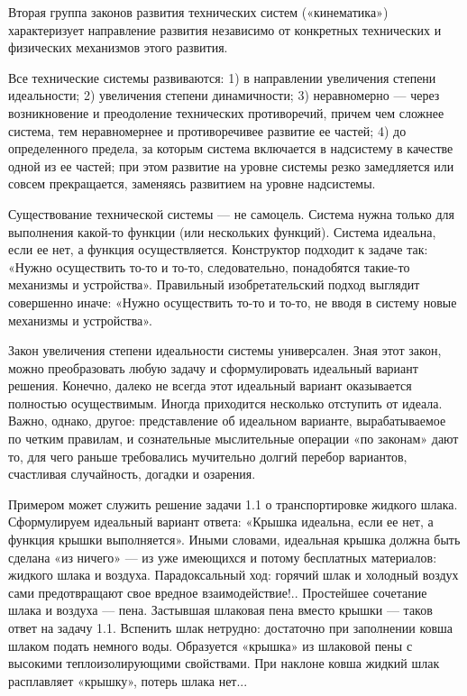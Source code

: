 Вторая  группа  законов  развития  технических  систем  («кинематика»)
характеризует   направление   развития    независимо   от   конкретных
технических и физических механизмов этого развития.

Все  технические  системы  развиваются: 1)  в  направлении  увеличения
степени   идеальности;   2)   увеличения  степени   динамичности;   3)
неравномерно   —  через   возникновение   и  преодоление   технических
противоречий,  причем   чем  сложнее  система,  тем   неравномернее  и
противоречивее  развитие ее  частей; 4)  до определенного  предела, за
которым система включается в надсистему в качестве одной из ее частей;
при  этом развитие  на  уровне системы  резко  замедляется или  совсем
прекращается, заменяясь развитием на уровне надсистемы.


Существование  технической  системы  —   не  самоцель.  Система  нужна
только  для  выполнения  какой-то функции  (или  нескольких  функций).
Система   идеальна,   если   ее   нет,   а   функция   осуществляется.
Конструктор  подходит  к  задаче   так:  «Нужно  осуществить  то-то  и
то-то,  следовательно, понадобятся  такие-то механизмы  и устройства».
Правильный изобретательский  подход выглядит совершенно  иначе: «Нужно
осуществить  то-то и  то-то,  не  вводя в  систему  новые механизмы  и
устройства».

Закон  увеличения   степени  идеальности  системы   универсален.  Зная
этот  закон,   можно  преобразовать  любую  задачу   и  сформулировать
идеальный вариант  решения. Конечно,  далеко не всегда  этот идеальный
вариант   оказывается   полностью  осуществимым.   Иногда   приходится
несколько отступить  от идеала.  Важно, однако,  другое: представление
об   идеальном  варианте,   вырабатываемое  по   четким  правилам,   и
сознательные  мыслительные операции  «по  законам» дают  то, для  чего
раньше  требовались мучительно  долгий  перебор вариантов,  счастливая
случайность, догадки и озарения.

Примером может  служить решение  задачи 1.1 о  транспортировке жидкого
шлака. Сформулируем  идеальный вариант ответа: «Крышка  идеальна, если
ее нет, а функция крышки выполняется». Иными словами, идеальная крышка
должна быть сделана «из ничего» — из уже имеющихся и потому бесплатных
материалов: жидкого шлака и  воздуха. Парадоксальный ход: горячий шлак
и холодный  воздух сами  предотвращают свое  вредное взаимодействие!..
Простейшее сочетание шлака  и воздуха — пена.  Застывшая шлаковая пена
вместо крышки  — таков  ответ на задачу  1.1. Вспенить  шлак нетрудно:
достаточно при заполнении ковша шлаком подать немного воды. Образуется
«крышка» из шлаковой пены с высокими теплоизолирующими свойствами. При
наклоне ковша жидкий шлак расплавляет «крышку», потерь шлака нет...

